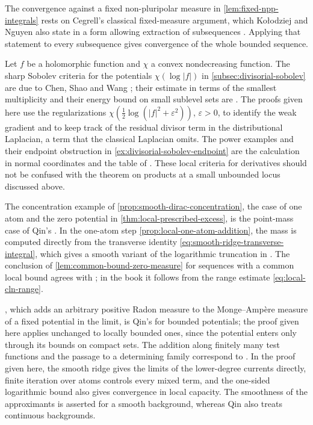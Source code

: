 The convergence against a fixed non-pluripolar measure in \cref{lem:fixed-npp-integrals} rests on Cegrell's classical fixed-measure argument, which Ko{\l}odziej and Nguyen also state in a form allowing extraction of subsequences \cite[Lemma~2.1 and Corollary~2.2, p.~116]{KN22}. Applying that statement to every subsequence gives convergence of the whole bounded sequence.

Let $f$ be a holomorphic function and $\chi$ a convex nondecreasing function. The sharp Sobolev criteria for the potentials $\chi(\log|f|)$ in \cref{subsec:divisorial-sobolev} are due to Chen, Shao and Wang \cite[v1, Theorems~1.1--1.2, pp.~2--3 and 19--22]{CSW26}; their estimate in terms of the smallest multiplicity and their energy bound on small sublevel sets are \cite[v1, Lemma~4.1 and Proposition~3.8, pp.~16--20]{CSW26}. The proofs given here use the regularizations $\chi(\frac12\log(|f|^2+\varepsilon^2))$, $\varepsilon>0$, to identify the weak gradient and to keep track of the residual divisor term in the distributional Laplacian, a term that the classical Laplacian omits. The power examples and their endpoint obstruction in \cref{ex:divisorial-sobolev-endpoint} are the calculation in normal coordinates and the table of \cite[v1, Lemma~2.1 and Section~6.1, pp.~6--7 and 24--25]{CSW26}. These local criteria for derivatives should not be confused with the theorem on products at a small unbounded locus discussed above.

The concentration example of \cref{prop:smooth-dirac-concentration}, the case of one atom and the zero potential in \cref{thm:local-prescribed-excess}, is the point-mass case of Qin's \cite[v1, Corollary~3.6, p.~14]{QinLimits26}. In the one-atom step \cref{prop:local-one-atom-addition}, the mass is computed directly from the transverse identity \eqref{eq:smooth-ridge-transverse-integral}, which gives a smooth variant of the logarithmic truncation in \cite[v1, Lemma~2.4, pp.~9--10]{QinLimits26}. The conclusion of \cref{lem:common-bound-zero-measure} for sequences with a common local bound agrees with \cite[v1, Proposition~7.2, p.~26]{QinLimits26}; in the book it follows from the range estimate \eqref{eq:local-cln-range}.

, which adds an arbitrary positive Radon measure to the Monge--Amp\`ere measure of a fixed potential in the limit, is Qin's \cite[v1, Theorem~B, p.~3]{QinLimits26} for bounded potentials; the proof given here applies unchanged to locally bounded ones, since the potential enters only through its bounds on compact sets. The addition along finitely many test functions and the passage to a determining family correspond to \cite[v1, Proposition~3.2 and Theorem~3.4, pp.~11--14]{QinLimits26}. In the proof given here, the smooth ridge gives the limits of the lower-degree currents directly, finite iteration over atoms controls every mixed term, and the one-sided logarithmic bound also gives convergence in local capacity. The smoothness of the approximants is asserted for a smooth background, whereas Qin also treats continuous backgrounds.

